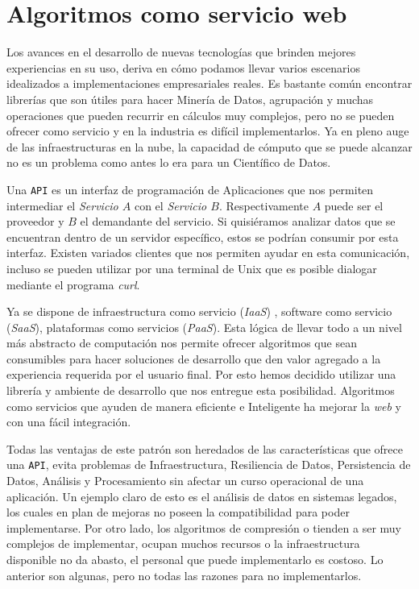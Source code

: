 \section{Algoritmos como servicio web }

	Los avances en el desarrollo de nuevas tecnologías que brinden mejores experiencias en su uso, deriva en cómo podamos llevar varios escenarios idealizados a implementaciones empresariales reales. Es bastante común encontrar librerías que son útiles para hacer Minería de Datos, agrupación y muchas operaciones que pueden recurrir en cálculos muy complejos, pero no se pueden ofrecer como servicio y en la industria es difícil implementarlos. Ya en pleno auge de las infraestructuras en la nube, la capacidad de cómputo que se puede alcanzar no es un problema como antes lo era para un Científico de Datos.


	Una \texttt{API} es un interfaz de programación de Aplicaciones que nos permiten intermediar el \emph{Servicio $A$} con el \emph{Servicio $B$}. Respectivamente $A$ puede ser el proveedor y $B$ el demandante del servicio. Si quisiéramos analizar datos que se encuentran dentro de un servidor específico, estos se podrían consumir por esta interfaz. Existen variados clientes que nos permiten ayudar en esta comunicación, incluso se pueden utilizar por una terminal de {Unix} que es posible dialogar mediante el programa \emph{curl}.
	
	Ya se dispone de infraestructura como servicio (\emph{IaaS}) , software como servicio (\emph{SaaS}), plataformas como servicios (\emph{PaaS}). Esta lógica de llevar todo a un nivel más abstracto de computación nos permite ofrecer  algoritmos que sean consumibles para hacer soluciones de desarrollo que den valor agregado a la experiencia requerida por el usuario final. Por esto hemos decidido utilizar una librería y ambiente de desarrollo que nos entregue esta posibilidad. Algoritmos como servicios que ayuden de manera eficiente e Inteligente ha mejorar la \emph{web} y con una fácil integración. 
	
	Todas las ventajas de este patrón son heredados de las características que ofrece una \texttt{API}, evita problemas de Infraestructura, Resiliencia de Datos, Persistencia de Datos, Análisis y Procesamiento sin afectar un curso operacional de una aplicación. Un ejemplo claro de esto es el análisis de datos en sistemas legados, los cuales en plan de mejoras no poseen la compatibilidad para poder implementarse. Por otro lado, los algoritmos de compresión o  \machinelearning tienden a ser muy complejos de implementar, ocupan muchos recursos o la infraestructura disponible no da abasto, el personal que puede implementarlo es costoso. Lo anterior son algunas, pero no todas las razones para no  implementarlos. 
